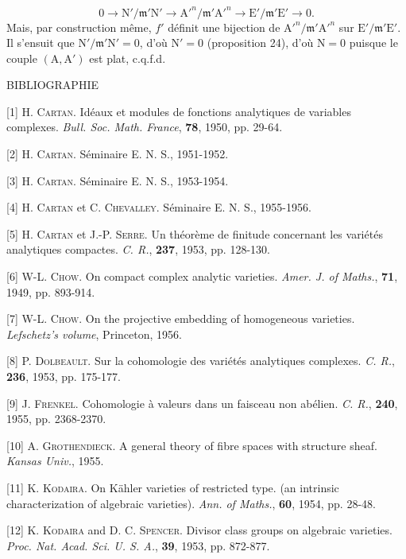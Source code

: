 \begin{equation*}
0 \longrightarrow \mathrm{N}'/\mathfrak{m}'\mathrm{N}' \longrightarrow \mathrm{A}'^n/\mathfrak{m}'\mathrm{A}'^n \longrightarrow \mathrm{E}'/\mathfrak{m}'\mathrm{E}' \longrightarrow 0.
\end{equation*}
Mais, par construction même, $f'$ définit une bijection de $\mathrm{A}'^n/\mathfrak{m}'\mathrm{A}'^n$ sur $\mathrm{E}'/\mathfrak{m}'\mathrm{E}'$. Il s'ensuit que $\mathrm{N}'/\mathfrak{m}'\mathrm{N}' = 0$, d'où $\mathrm{N}' = 0$ (proposition 24), d'où $\mathrm{N} = 0$ puisque le couple $(\mathrm{A}, \mathrm{A}')$ est plat, c.q.f.d.


\begin{center}BIBLIOGRAPHIE\end{center}

[1] H. \textsc{Cartan}. Idéaux et modules de fonctions analytiques de variables complexes. \textit{Bull. Soc. Math. France}, \textbf{78}, 1950, pp. 29-64.

[2] H. \textsc{Cartan}. Séminaire E. N. S., 1951-1952.

[3] H. \textsc{Cartan}. Séminaire E. N. S., 1953-1954.

[4] H. \textsc{Cartan} et C. \textsc{Chevalley}. Séminaire E. N. S., 1955-1956.

[5] H. \textsc{Cartan} et J.-P. \textsc{Serre}. Un théorème de finitude concernant les variétés analytiques compactes. \textit{C. R.}, \textbf{237}, 1953, pp. 128-130.

[6] W-L. \textsc{Chow}. On compact complex analytic varieties. \textit{Amer. J. of Maths.}, \textbf{71}, 1949, pp. 893-914.

[7] W-L. \textsc{Chow}. On the projective embedding of homogeneous varieties. \textit{Lefschetz's volume}, Princeton, 1956.

[8] P. \textsc{Dolbeault}. Sur la cohomologie des variétés analytiques complexes. \textit{C. R.}, \textbf{236}, 1953, pp. 175-177.

[9] J. \textsc{Frenkel}. Cohomologie à valeurs dans un faisceau non abélien. \textit{C. R.}, \textbf{240}, 1955, pp. 2368-2370.

[10] A. \textsc{Grothendieck}. A general theory of fibre spaces with structure sheaf. \textit{Kansas Univ.}, 1955.

[11] K. \textsc{Kodaira}. On Kähler varieties of restricted type. (an intrinsic characterization of algebraic varieties). \textit{Ann. of Maths.}, \textbf{60}, 1954, pp. 28-48.

[12] K. \textsc{Kodaira} and D. C. \textsc{Spencer}. Divisor class groups on algebraic varieties. \textit{Proc. Nat. Acad. Sci. U. S. A.}, \textbf{39}, 1953, pp. 872-877.

